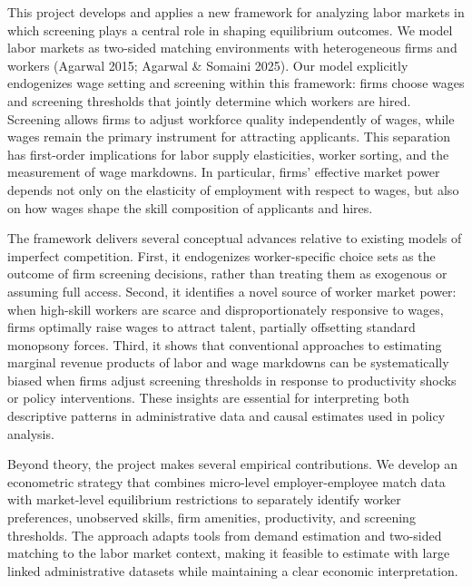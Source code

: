 \documentclass[11pt]{article}
\begin{document}
This project develops and applies a new framework for analyzing labor markets in which screening plays a central role in shaping equilibrium outcomes. We model labor markets as two-sided matching environments with heterogeneous firms and workers (Agarwal 2015; Agarwal \& Somaini 2025). Our model explicitly endogenizes wage setting and screening within this framework: firms choose wages and screening thresholds that jointly determine which workers are hired. Screening allows firms to adjust workforce quality independently of wages, while wages remain the primary instrument for attracting applicants. This separation has first-order implications for labor supply elasticities, worker sorting, and the measurement of wage markdowns. In particular, firms’ effective market power depends not only on the elasticity of employment with respect to wages, but also on how wages shape the skill composition of applicants and hires.

The framework delivers several conceptual advances relative to existing models of imperfect competition. First, it endogenizes worker-specific choice sets as the outcome of firm screening decisions, rather than treating them as exogenous or assuming full access. Second, it identifies a novel source of worker market power: when high-skill workers are scarce and disproportionately responsive to wages, firms optimally raise wages to attract talent, partially offsetting standard monopsony forces. Third, it shows that conventional approaches to estimating marginal revenue products of labor and wage markdowns can be systematically biased when firms adjust screening thresholds in response to productivity shocks or policy interventions. These insights are essential for interpreting both descriptive patterns in administrative data and causal estimates used in policy analysis.

Beyond theory, the project makes several empirical contributions. We develop an econometric strategy that combines micro-level employer-employee match data with market-level equilibrium restrictions to separately identify worker preferences, unobserved skills, firm amenities, productivity, and screening thresholds. The approach adapts tools from demand estimation and two-sided matching to the labor market context, making it feasible to estimate with large linked administrative datasets while maintaining a clear economic interpretation.
\end{document}

